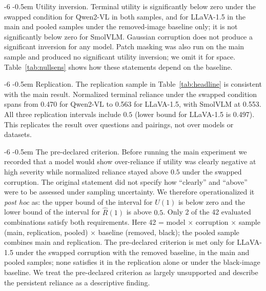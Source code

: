 \documentclass[graybox]{svmult}
\makeatletter
\newcommand{\checknum}[2]{#1}
\renewcommand\paragraph{\@startsection{paragraph}{4}{\z@}%
  {-6\p@ \@plus -2\p@ \@minus -2\p@}%
  {-0.5em}%
  {\normalfont\normalsize\bfseries}}
\makeatother
\begin{document}
\paragraph{Utility inversion.}
Terminal utility is significantly below zero under the swapped condition
for Qwen2-VL in both samples, and for LLaVA-1.5 in the main and pooled
samples under the removed-image baseline only; it is not significantly below
zero for SmolVLM. Gaussian corruption does not produce a significant
inversion for any model. Patch masking was also run on the main sample and
produced no significant utility inversion; we omit it for space.
Table~\ref{tab:nullsens} shows how these statements depend on the baseline.

\paragraph{Replication.}
The replication sample in Table~\ref{tab:headline} is consistent with the main result.
Normalized terminal reliance under the swapped condition spans from
\checknum{0.470}{rep:Qwen:swapblend:R_hat_1} for Qwen2-VL to
\checknum{0.563}{rep:llava:swapblend:R_hat_1} for LLaVA-1.5, with SmolVLM at
\checknum{0.553}{rep:SmolVLM:swapblend:R_hat_1}. All three replication
intervals include $0.5$ (lower bound for LLaVA-1.5 is
\checknum{0.497}{rep:llava:swapblend:R_hat_1_ci_lo}).
This replicates the result over questions and pairings, not over models or
datasets.

\paragraph{The pre-declared criterion.}
Before running the main experiment we recorded that a model would show
over-reliance if utility was clearly negative at high severity while
normalized reliance stayed above $0.5$ under the swapped corruption. The
original statement did not specify how ``clearly'' and ``above'' were to
be assessed under sampling uncertainty. We therefore operationalized it
\emph{post hoc} as: the upper bound of the interval for $U(1)$ is below
zero and the lower bound of the interval for $\hat R(1)$ is above $0.5$.
Only \checknum{2}{criterion:status:count_met} of the 42
evaluated combinations satisfy both requirements. Here 42 = model $\times$ corruption $\times$ sample (main, replication, pooled) $\times$ baseline (removed, black); the pooled sample combines main and replication.
The pre-declared criterion is met only for LLaVA-1.5 under the swapped
corruption with the removed baseline, in the main and pooled samples;
none satisfies it in the replication alone or under the black-image baseline.
We treat the pre-declared criterion as largely unsupported and describe
the persistent reliance as a descriptive finding.
\end{document}
